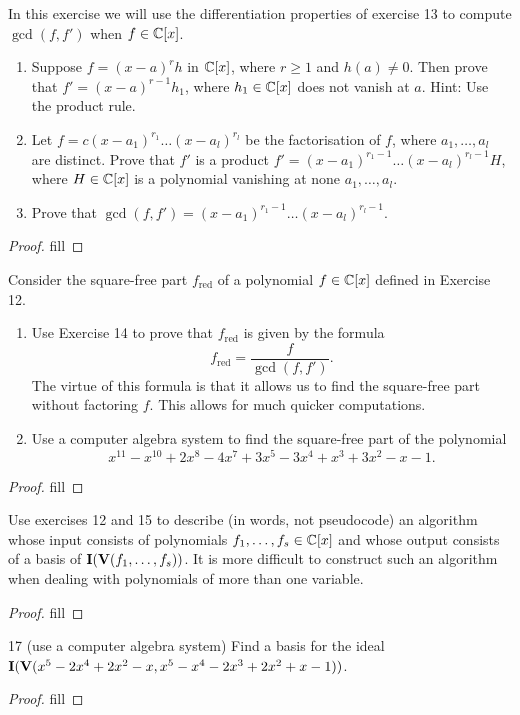 \begin{exercise}{14}
In this exercise we will use the differentiation properties of exercise 13 to compute $\gcd(f,f')$ when $f\in\mathbb{C}[x]$.
\begin{enumerate}
    \item Suppose $f=(x-a)^rh$ in $\mathbb{C}[x]$, where $r\geq 1$ and $h(a)\neq 0$. Then prove that $f'=(x-a)^{r-1}h_1$, where $h_1\in\mathbb{C}[x]$ does not vanish at $a$. Hint: Use the product rule.
    \item Let $f=c(x-a_1)^{r_1}\dots(x-a_l)^{r_l}$ be the factorisation of $f$, where $a_1,\dots,a_l$ are distinct. Prove that $f'$ is a product $f'=(x-a_1)^{r_1-1}\dots(x-a_l)^{r_l-1}H$, where $H\in\mathbb{C}[x]$ is a polynomial vanishing at none $a_1,\dots,a_l$.
    \item Prove that $\gcd(f,f')=(x-a_1)^{r_1-1}\dots(x-a_l)^{r_l-1}$.
\end{enumerate}
\end{exercise}
\begin{proof}
fill
\end{proof}

\begin{exercise}{15}
Consider the square-free part $f_{\text{red}}$ of a polynomial $f\in\mathbb{C}[x]$ defined in Exercise 12.
\begin{enumerate}
    \item Use Exercise 14 to prove that $f_{\text{red}}$ is given by the formula
    \[
    f_{\text{red}} =\frac{f}{\gcd(f,f')}.
    \]
    The virtue of this formula is that it allows us to find the square-free part without factoring $f$. This allows for much quicker computations.
    \item Use a computer algebra system to find the square-free part of the polynomial 
    \[
    x^11-x^10+2x^8-4x^7+3x^5-3x^4+x^3+3x^2-x-1.
    \]
\end{enumerate}
\end{exercise}
\begin{proof}
fill
\end{proof}

\begin{exercise}{16}
Use exercises 12 and 15 to describe (in words, not pseudocode) an algorithm whose input consists of polynomials $f_1,\dots,f_s\in\mathbb{C}[x]$ and whose output consists of a basis of $\mathbf{I}(\mathbf{V}(f_1,\dots,f_s))$. It is more difficult to construct such an algorithm when dealing with polynomials of more than one variable.
\end{exercise}
\begin{proof}
fill
\end{proof}

\begin{exercise}{17}
17 (use a computer algebra system)
Find a basis for the ideal $\mathbf{I}(\mathbf{V}(x^5-2x^4+2x^2-x, x^5-x^4-2x^3+2x^2+x-1))$.
\end{exercise}
\begin{proof}
fill
\end{proof}